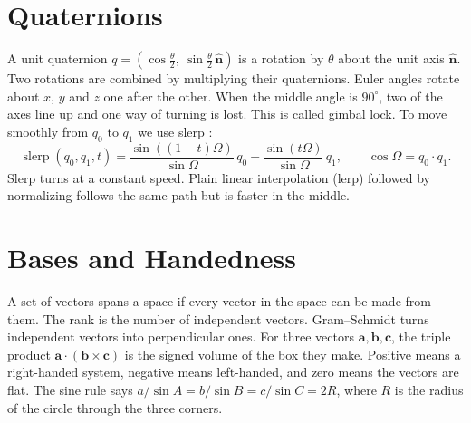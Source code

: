 \section{Quaternions}
A unit quaternion $q=(\cos\tfrac\theta2,\ \sin\tfrac\theta2\,\hat{\mathbf n})$ is a rotation by $\theta$ about the unit axis $\hat{\mathbf n}$. Two rotations are combined by multiplying their quaternions. Euler angles rotate about $x$, $y$ and $z$ one after the other. When the middle angle is $90^\circ$, two of the axes line up and one way of turning is lost. This is called gimbal lock. To move smoothly from $q_0$ to $q_1$ we use slerp \cite{shoemake1985}:
\[
\operatorname{slerp}(q_0,q_1,t)=\frac{\sin((1-t)\Omega)}{\sin\Omega}\,q_0+\frac{\sin(t\Omega)}{\sin\Omega}\,q_1,\qquad \cos\Omega=q_0\cdot q_1 .
\]
Slerp turns at a constant speed. Plain linear interpolation (lerp) followed by normalizing follows the same path but is faster in the middle.

\section{Bases and Handedness}
A set of vectors spans a space if every vector in the space can be made from them. The rank is the number of independent vectors. Gram--Schmidt turns independent vectors into perpendicular ones. For three vectors $\mathbf a,\mathbf b,\mathbf c$, the triple product $\mathbf a\cdot(\mathbf b\times\mathbf c)$ is the signed volume of the box they make. Positive means a right-handed system, negative means left-handed, and zero means the vectors are flat. The sine rule says $a/\sin A=b/\sin B=c/\sin C=2R$, where $R$ is the radius of the circle through the three corners.
